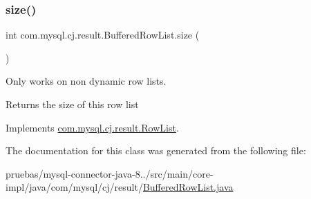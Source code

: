 \subsubsection{\texorpdfstring{size()}{size()}}
{\footnotesize\ttfamily int com.\+mysql.\+cj.\+result.\+Buffered\+Row\+List.\+size (\begin{DoxyParamCaption}{ }\end{DoxyParamCaption})}

Only works on non dynamic row lists.

\begin{DoxyReturn}{Returns}
the size of this row list 
\end{DoxyReturn}


Implements \mbox{\hyperlink{interfacecom_1_1mysql_1_1cj_1_1result_1_1_row_list_a2b6e2d9ed59e362e06b9fc8a110ccd89}{com.\+mysql.\+cj.\+result.\+Row\+List}}.



The documentation for this class was generated from the following file\+:\begin{DoxyCompactItemize}
\item 
pruebas/mysql-\/connector-\/java-\/8../src/main/core-\/impl/java/com/mysql/cj/result/\mbox{\hyperlink{_buffered_row_list_8java}{Buffered\+Row\+List.\+java}}\end{DoxyCompactItemize}
